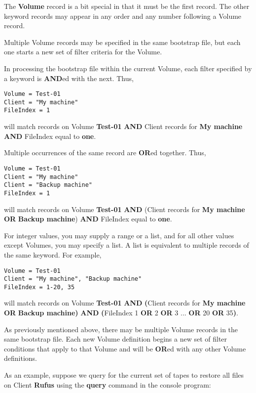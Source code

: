 The {\bf Volume} record is a bit special in that it must be the first record.
The other keyword records may appear in any order and any number following a
Volume record. 

Multiple Volume records may be specified in the same bootstrap file, but each
one starts a new set of filter criteria for the Volume. 

In processing the bootstrap file within the current Volume, each filter
specified by a keyword is {\bf AND}ed with the next. Thus, 

\footnotesize
\begin{verbatim}
Volume = Test-01
Client = "My machine"
FileIndex = 1
\end{verbatim}
\normalsize

will match records on Volume {\bf Test-01} {\bf AND} Client records for {\bf
My machine} {\bf AND} FileIndex equal to {\bf one}. 

Multiple occurrences of the same record are {\bf OR}ed together. Thus, 

\footnotesize
\begin{verbatim}
Volume = Test-01
Client = "My machine"
Client = "Backup machine"
FileIndex = 1
\end{verbatim}
\normalsize

will match records on Volume {\bf Test-01} {\bf AND} (Client records for {\bf
My machine} {\bf OR} {\bf Backup machine}) {\bf AND} FileIndex equal to {\bf
one}. 

For integer values, you may supply a range or a list, and for all other values
except Volumes, you may specify a list. A list is equivalent to multiple
records of the same keyword. For example, 

\footnotesize
\begin{verbatim}
Volume = Test-01
Client = "My machine", "Backup machine"
FileIndex = 1-20, 35
\end{verbatim}
\normalsize

will match records on Volume {\bf Test-01} {\bf AND} {\bf (}Client records for
{\bf My machine} {\bf OR} {\bf Backup machine}{\bf )} {\bf AND} {\bf
(}FileIndex 1 {\bf OR} 2 {\bf OR} 3 ... {\bf OR} 20 {\bf OR} 35{\bf )}. 

As previously mentioned above, there may be multiple Volume records in the
same bootstrap file. Each new Volume definition begins a new set of filter
conditions that apply to that Volume and will be {\bf OR}ed with any other
Volume definitions. 

As an example, suppose we query for the current set of tapes to restore all
files on Client {\bf Rufus} using the {\bf query} command in the console
program: 

